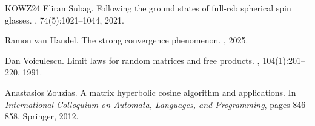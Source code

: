 \documentclass[11pt]{article}
\theoremstyle{definition}
\theoremstyle{remark}
\numberwithin{equation}{section}
\numberwithin{theorem}{section}
\begin{document}
\begin{thebibliography}{KOWZ24}
Eliran Subag.
\newblock Following the ground states of full-rsb spherical spin glasses.
, 74(5):1021--1044, 2021.

Ramon van Handel.
\newblock The strong convergence phenomenon.
, 2025.

Dan Voiculescu.
\newblock Limit laws for random matrices and free products.
, 104(1):201--220, 1991.

Anastasios Zouzias.
\newblock A matrix hyperbolic cosine algorithm and applications.
\newblock In {\em International Colloquium on Automata, Languages, and Programming}, pages 846--858. Springer, 2012.

\end{thebibliography}
\end{document}
